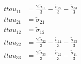 \begin{align}
ttau_{11} &= \frac{2\,\tilde{\sigma }_{11}}{3}-\frac{\tilde{\sigma }_{22}}{3}-\frac{\tilde{\sigma }_{33}}{3} \\ 
ttau_{21} &= \tilde{\sigma }_{21} \\ 
ttau_{12} &= \tilde{\sigma }_{12} \\ 
ttau_{22} &= \frac{2\,\tilde{\sigma }_{22}}{3}-\frac{\tilde{\sigma }_{11}}{3}-\frac{\tilde{\sigma }_{33}}{3} \\ 
ttau_{33} &= \frac{2\,\tilde{\sigma }_{33}}{3}-\frac{\tilde{\sigma }_{22}}{3}-\frac{\tilde{\sigma }_{11}}{3} 
\end{align}
